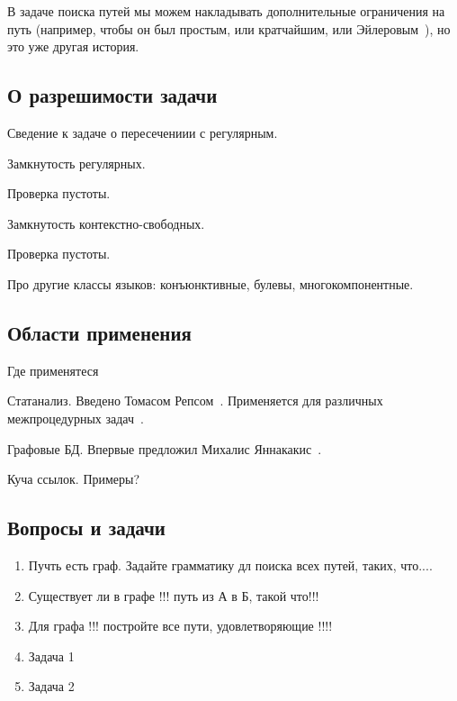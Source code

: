 В задаче поиска путей мы можем накладывать дополнительные ограничения на путь (например, чтобы он был простым, или кратчайшим, или Эйлеровым~\cite{kupferman2016eulerian}), но это уже другая история.


\subsection{О разрешимости задачи}

Сведение к задаче о пересечениии с регулярным.

Замкнутость регулярных.

Проверка пустоты.

Замкнутость контекстно-свободных.

Проверка пустоты.

Про другие классы языков: конъюнктивные, булевы, многокомпонентные.

\subsection{Области применения}

Где применятеся

Статанализ. 
Введено Томасом Репсом~\cite{Reps}.
Применяется для различных межпроцедурных задач~\cite{LabelFlowCFLReachability,specificationCFLReachability,Zheng}.

Графовые БД.
Впервые предложил Михалис Яннакакис~\cite{Yannakakis}.

Куча ссылок. Примеры?

\subsection{Вопросы и задачи}
\begin{enumerate}
  \item Пучть есть граф. Задайте грамматику дл поиска всех путей, таких, что....
  \item Существует ли в графе !!! путь из А в Б, такой что!!!
  \item Для графа !!! постройте все пути, удовлетворяющие !!!!

  \item Задача 1
  \item Задача 2
\end{enumerate}
